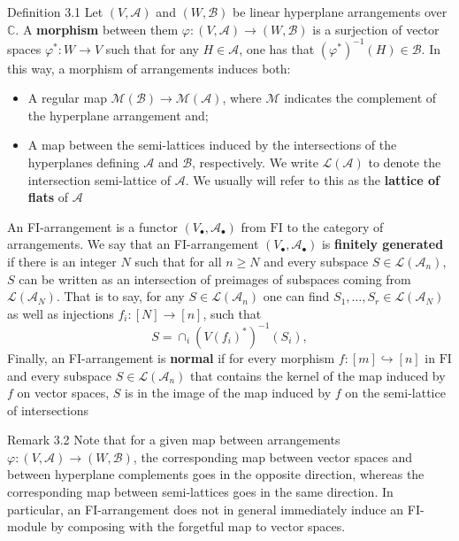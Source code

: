 \begin{sourceblock}{Definition 3.1}
Let $(V,\mathcal{A})$ and $(W,\mathcal{B})$ be linear hyperplane arrangements over $\mathbb{C}$. A \textbf{morphism} between them $\varphi:(V,\mathcal{A})\to(W,\mathcal{B})$ is a surjection of vector spaces $\varphi^*:W\to V$ such that for any $H\in\mathcal{A}$, one has that $(\varphi^*)^{-1}(H)\in\mathcal{B}$. In this way, a morphism of arrangements induces both:
\begin{itemize}
\item A regular map $\mathcal{M}(\mathcal{B})\to\mathcal{M}(\mathcal{A})$, where $\mathcal{M}$ indicates the complement of the hyperplane arrangement and;
\item A map between the semi-lattices induced by the intersections of the hyperplanes defining $\mathcal{A}$ and $\mathcal{B}$, respectively. We write $\mathcal{L}(\mathcal{A})$ to denote the intersection semi-lattice of $\mathcal{A}$. We usually will refer to this as the \textbf{lattice of flats} of $\mathcal{A}$
\end{itemize}
An FI-arrangement is a functor $(V_\bullet,\mathcal{A}_\bullet)$ from $\mathrm{FI}$ to the category of arrangements. We say that an FI-arrangement $(V_\bullet,\mathcal{A}_\bullet)$ is \textbf{finitely generated} if there is an integer $N$ such that for all $n\geq N$ and every subspace $S\in\mathcal{L}(\mathcal{A}_n)$, $S$ can be written as an intersection of preimages of subspaces coming from $\mathcal{L}(\mathcal{A}_N)$. That is to say, for any $S\in\mathcal{L}(\mathcal{A}_n)$ one can find $S_1,\ldots,S_r\in\mathcal{L}(\mathcal{A}_N)$ as well as injections $f_i:[N]\to[n]$, such that
\[
 S=\cap_i(V(f_i)^*)^{-1}(S_i),
\]
Finally, an FI-arrangement is \textbf{normal} if for every morphism $f:[m]\hookrightarrow[n]$ in $\mathrm{FI}$ and every subspace $S\in\mathcal{L}(\mathcal{A}_n)$ that contains the kernel of the map induced by $f$ on vector spaces, $S$ is in the image of the map induced by $f$ on the semi-lattice of intersections
\end{sourceblock}
\begin{sourceblockroman}{Remark 3.2}
Note that for a given map between arrangements $\varphi:(V,\mathcal{A})\to(W,\mathcal{B})$, the corresponding map between vector spaces and between hyperplane complements goes in the opposite direction, whereas the corresponding map between semi-lattices goes in the same direction. In particular, an FI-arrangement does not in general immediately induce an FI-module by composing with the forgetful map to vector spaces.
\end{sourceblockroman}

